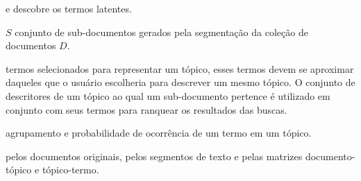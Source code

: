 














e descobre os termos latentes. 




$S$ conjunto de sub-documentos gerados pela segmentação da coleção de documentos $D$.







termos selecionados para representar um tópico, esses termos devem se aproximar daqueles que o usuário escolheria para descrever um mesmo tópico. O conjunto de descritores de um tópico ao qual um sub-documento pertence é utilizado em conjunto com seus termos para ranquear os resultados das buscas.


agrupamento e probabilidade de ocorrência de um termo em um tópico.

pelos documentos originais, pelos segmentos de texto e pelas matrizes documento-tópico e tópico-termo.








